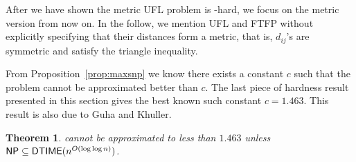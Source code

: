 \documentclass[oneside,final]{ucr}
\newtheorem{theorem}{Theorem}
\begin{document}
After we have shown the metric UFL problem is {\MaxSNP}-hard,
we focus on the metric version from now on. In the follow,
we mention UFL and FTFP without explicitly specifying that
their distances form a metric, that is, $d_{ij}$'s are
symmetric and satisfy the triangle inequality.

From Proposition~\ref{prop:maxsnp} we know there exists a
constant $c$ such that the {\UFL} problem cannot be
approximated better than $c$. The last piece of hardness
result presented in this section gives the best known such
constant $c=1.463$. This result is also due to Guha and
Khuller.
\begin{theorem}\label{thm:1463} \cite{GuhaK98}
  {\UFL} cannot be approximated to less than $1.463$ unless
  \\ 
  ${\mbox{\sf NP}} \subseteq {\mbox{\sf DTIME}}(n^{O(\log\log n)})$.
\end{theorem}
\end{document}
